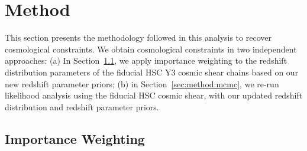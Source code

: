 \section{Method}
\label{sec:method}


This section presents the methodology followed in this analysis to recover cosmological constraints. We obtain cosmological constraints in two independent approaches: (a) In Section~\ref{sec:method:importance}, we apply importance weighting to the redshift distribution parameters of the fiducial HSC Y3 cosmic shear chains \cite{Li2023_HSCY3_CosmicShear,Dalal2023CosmoShearHSC} based on our new redshift parameter priors; (b) in Section~\ref{sec:method:mcmc}, we re-run likelihood analysis using the fiducial HSC cosmic shear, with our updated redshift distribution and redshift parameter priors. 


\subsection{Importance Weighting}
\label{sec:method:importance}

